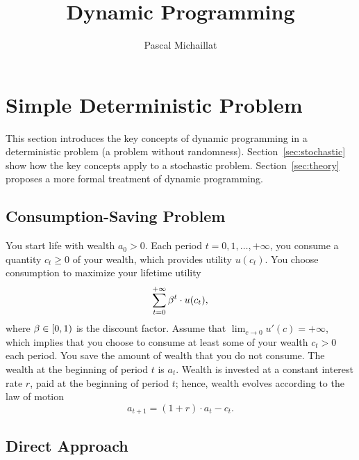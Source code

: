 \documentclass[letterpaper,12pt,leqno]{article}
\begin{document}
\title{Dynamic Programming}
\author{Pascal Michaillat}
\date{}

\begin{titlepage}
\maketitle
\tableofcontents
\end{titlepage}

\section{Simple Deterministic Problem}\label{sec:deterministic}

This section introduces the key concepts of dynamic programming in a deterministic problem (a problem without randomness). Section~\ref{sec:stochastic} show how the key concepts apply to a stochastic problem. Section~\ref{sec:theory} proposes a more formal treatment of dynamic programming.

\subsection{Consumption-Saving Problem}\label{subsec:PROBLEM}

You start life with wealth $a_0>0$. Each period $t=0,1,\ldots,+\infty$, you consume a quantity $c_t\geq 0$ of your wealth, which provides utility $u(c_t)$. You choose consumption to maximize your lifetime utility
\begin{equation*}
 \sum_{t=0}^{+\infty}\beta^t \cdot u(c_t),
\end{equation*}
where $\beta\in[0,1)$ is the discount factor. Assume that $\lim_{c\to 0} u'(c)=+\infty$, which implies that you choose to consume at least some of your wealth $c_{t}>0$ each period. You save the amount of wealth that you do not consume. The wealth at the beginning of period $t$ is $a_t$. Wealth is invested at a constant interest rate $r$, paid at the beginning of period $t$; hence, wealth evolves according to the law of motion\[a_{t+1}=(1+r)\cdot a_t - c_t.\]

\subsection{Direct Approach}
\end{document}
